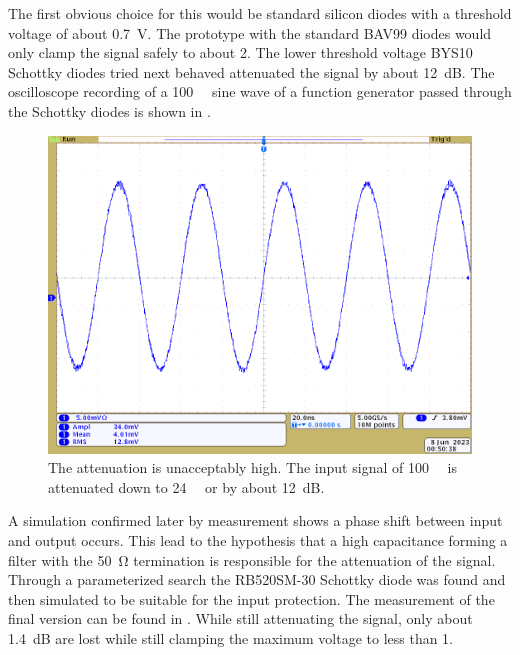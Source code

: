 The first obvious choice for this would be standard silicon diodes with a threshold voltage of about \qty{0.7}{\volt}. The prototype with the standard BAV99 diodes would only clamp the signal safely to about \qty{2}{\vpp}. The lower threshold voltage BYS10 Schottky diodes tried next behaved attenuated the signal by about \qty{12}{\deci\bel}. The oscilloscope recording of a \qty{100}{\milli\vpp} sine wave of a function generator passed through the Schottky diodes is shown in .

\begin{figure}[hbt]
    \centering
    \includegraphics{images/protection_diode_input_100mVpp_attentuation.png}
    \caption{ The attenuation is unacceptably high. The input signal of \qty{100}{\milli\vpp} is attenuated down to \qty{24}{\milli\vpp} or by about \qty{12}{\deci\bel}.}
\end{figure}

A simulation confirmed later by measurement shows a phase shift between input and output occurs. This lead to the hypothesis that a high capacitance forming a filter with the \qty{50}{\ohm} termination is responsible for the attenuation of the signal. Through a parameterized search the RB520SM-30 Schottky diode was found and then simulated to be suitable for the input protection. The measurement of the final version can be found in . While still attenuating the signal, only about \qty{1.4}{\deci\bel} are lost while still clamping the maximum voltage to less than \qty{1}{\vpp}.

